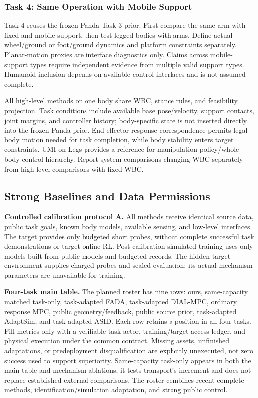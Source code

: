 \subsubsection{Task 4: Same Operation with Mobile Support}
\label{sec:task4}
Task 4 reuses the frozen Panda Task 3 prior. First compare the same arm with fixed
and mobile support, then test legged bodies with arms. Define actual wheel/ground or
foot/ground dynamics and platform constraints separately. Planar-motion proxies are
interface diagnostics only. Claims across mobile-support types require independent
evidence from multiple valid support types. Humanoid inclusion depends on available
control interfaces and is not assumed complete.

All high-level methods on one body share WBC, stance rules, and feasibility projection.
Task conditions include available base pose/velocity, support contacts, joint margins,
and controller history; body-specific state is not inserted directly into the frozen
Panda prior. End-effector response correspondence permits legal body motion needed
for task completion, while body stability enters target constraints. UMI-on-Legs
provides a reference for manipulation-policy/whole-body-control hierarchy\cite{umilegs}.
Report system comparisons changing WBC separately from high-level comparisons with fixed WBC.

\subsection{Strong Baselines and Data Permissions}
\textbf{Controlled calibration protocol A.} All methods receive identical source data,
public task goals, known body models, available sensing, and low-level interfaces.
The target provides only budgeted short probes, without complete successful task
demonstrations or target online RL. Post-calibration simulated training uses only models
built from public models and budgeted records. The hidden target environment supplies
charged probes and sealed evaluation; its actual mechanism parameters are unavailable
for training.

\textbf{Four-task main table.} The planned roster has nine rows: ours, same-capacity
matched task-only, task-adapted FADA, task-adapted DIAL-MPC, ordinary response MPC,
public geometry/feedback, public source prior, task-adapted AdaptSim, and task-adapted
ASID. Each row retains a position in all four tasks. Fill metrics only with a verifiable
task actor, training/target-access ledger, and physical execution under the common
contract. Missing assets, unfinished adaptations, or predeployment disqualification
are explicitly unexecuted, not zero success used to support superiority. Same-capacity
task-only appears in both the main table and mechanism ablations; it tests transport's
increment and does not replace established external comparisons. The roster combines
recent complete methods, identification/simulation adaptation, and strong public
control\cite{fada,dialmpc,adaptsim,asid}.

